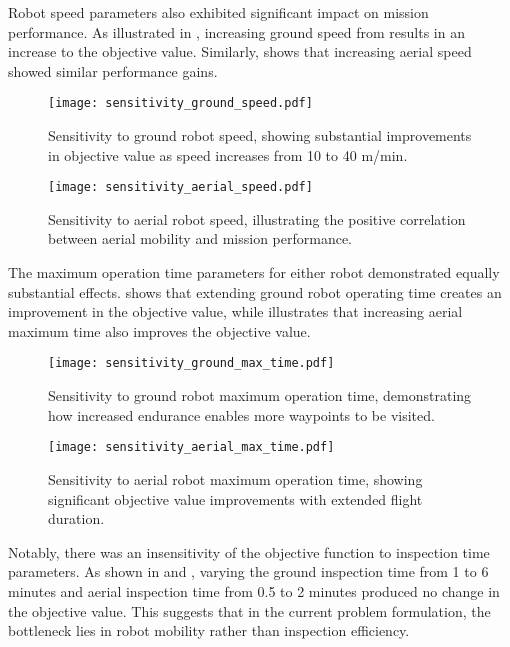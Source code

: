 \documentclass{article}
\begin{document}
	Robot speed parameters also exhibited significant impact on mission performance.
	As illustrated in , increasing ground speed from results in an increase to the objective value.
	Similarly,  shows that increasing aerial speed showed similar performance gains.

	\begin{figure}[htbp]
		\centering
		\texttt{[image: sensitivity\_ground\_speed.pdf]}
		\caption{Sensitivity to ground robot speed, showing substantial improvements in objective value as speed increases from 10 to 40 m/min.}
		\label{fig:ground_speed}
	\end{figure}


	\begin{figure}[htbp]
		\centering
		\texttt{[image: sensitivity\_aerial\_speed.pdf]}
		\caption{Sensitivity to aerial robot speed, illustrating the positive correlation between aerial mobility and mission performance.}
		\label{fig:aerial_speed}
	\end{figure}


	The maximum operation time parameters for either robot demonstrated equally substantial effects.  shows that extending ground robot operating time creates an improvement in the objective value, while  illustrates that increasing aerial maximum time also improves the objective value.

	\begin{figure}[htbp]
		\centering
		\texttt{[image: sensitivity\_ground\_max\_time.pdf]}
		\caption{Sensitivity to ground robot maximum operation time, demonstrating how increased endurance enables more waypoints to be visited.}
		\label{fig:ground_max_time}
	\end{figure}


	\begin{figure}[htbp]
		\centering
		\texttt{[image: sensitivity\_aerial\_max\_time.pdf]}
		\caption{Sensitivity to aerial robot maximum operation time, showing significant objective value improvements with extended flight duration.}
		\label{fig:aerial_max_time}
	\end{figure}


	Notably, there was an insensitivity of the objective function to inspection time parameters. 
	As shown in  and , varying the ground inspection time from 1 to 6 minutes and aerial inspection time from 0.5 to 2 minutes produced no change in the objective value. 
	This suggests that in the current problem formulation, the bottleneck lies in robot mobility rather than inspection efficiency.
\end{document}
